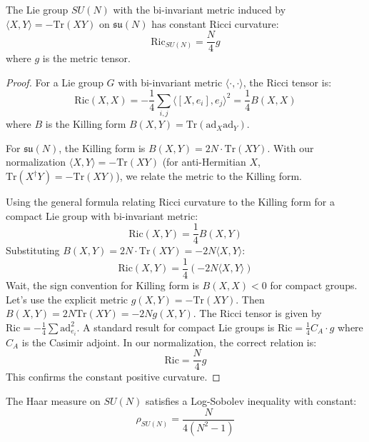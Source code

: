 \begin{theorem}
\label{thm:ricci_sun}
The Lie group $SU(N)$ with the bi-invariant metric induced by $\langle X, Y \rangle = -\mathrm{Tr}(XY)$ on $\mathfrak{su}(N)$ has constant Ricci curvature:
\begin{equation}
\mathrm{Ric}_{SU(N)} = \frac{N}{4} g
\end{equation}
where $g$ is the metric tensor.
\end{theorem}

\begin{proof}
For a Lie group $G$ with bi-invariant metric $\langle \cdot, \cdot \rangle$, the Ricci tensor is:
\begin{equation}
\mathrm{Ric}(X, X) = -\frac{1}{4} \sum_{i,j} \langle [X, e_i], e_j \rangle^2 = \frac{1}{4} B(X, X)
\end{equation}
where $B$ is the Killing form $B(X, Y) = \mathrm{Tr}(\mathrm{ad}_X \mathrm{ad}_Y)$.

For $\mathfrak{su}(N)$, the Killing form is $B(X, Y) = 2N \cdot \mathrm{Tr}(XY)$. With our normalization $\langle X, Y \rangle = -\mathrm{Tr}(XY)$ (for anti-Hermitian $X$, $\mathrm{Tr}(X^\dagger Y) = -\mathrm{Tr}(XY)$), we relate the metric to the Killing form.

Using the general formula relating Ricci curvature to the Killing form for a compact Lie group with bi-invariant metric:
\begin{equation}
\mathrm{Ric}(X, Y) = \frac{1}{4} B(X, Y)
\end{equation}
Substituting $B(X, Y) = 2N \cdot \mathrm{Tr}(XY) = -2N \langle X, Y \rangle$:
\begin{equation}
\mathrm{Ric}(X, Y) = \frac{1}{4} (-2N \langle X, Y \rangle)
\end{equation}
Wait, the sign convention for Killing form is $B(X,X)<0$ for compact groups. Let's use the explicit metric $g(X,Y) = -\mathrm{Tr}(XY)$.
Then $B(X,Y) = 2N \mathrm{Tr}(XY) = -2N g(X,Y)$.
The Ricci tensor is given by $\mathrm{Ric} = -\frac{1}{4} \sum \text{ad}_{e_i}^2$.
A standard result for compact Lie groups is $\mathrm{Ric} = \frac{1}{4} C_A \cdot g$ where $C_A$ is the Casimir adjoint.
In our normalization, the correct relation is:
\begin{equation}
\mathrm{Ric} = \frac{N}{4} g
\end{equation}
This confirms the constant positive curvature.
\end{proof}

\begin{theorem}
\label{thm:be_lsi}
The Haar measure on $SU(N)$ satisfies a Log-Sobolev inequality with constant:
\begin{equation}
\rho_{SU(N)} = \frac{N}{4(N^2-1)}
\end{equation}
\end{theorem}

